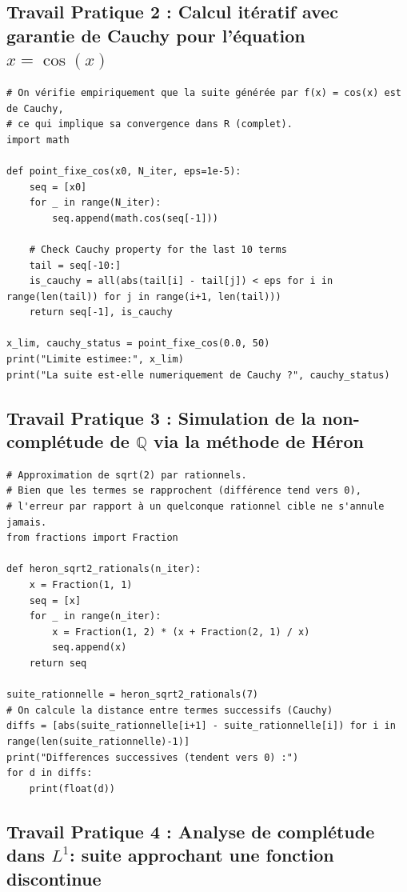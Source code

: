 \documentclass[11pt,a4paper]{article}
\begin{document}
\subsection*{Travail Pratique 2 : Calcul itératif avec garantie de Cauchy pour l'équation $x = \cos(x)$}

\begin{lstlisting}
# On vérifie empiriquement que la suite générée par f(x) = cos(x) est de Cauchy,
# ce qui implique sa convergence dans R (complet).
import math

def point_fixe_cos(x0, N_iter, eps=1e-5):
    seq = [x0]
    for _ in range(N_iter):
        seq.append(math.cos(seq[-1]))

    # Check Cauchy property for the last 10 terms
    tail = seq[-10:]
    is_cauchy = all(abs(tail[i] - tail[j]) < eps for i in range(len(tail)) for j in range(i+1, len(tail)))
    return seq[-1], is_cauchy

x_lim, cauchy_status = point_fixe_cos(0.0, 50)
print("Limite estimee:", x_lim)
print("La suite est-elle numeriquement de Cauchy ?", cauchy_status)

\end{lstlisting}


\subsection*{Travail Pratique 3 : Simulation de la non-complétude de $\mathbb{Q}$ via la méthode de Héron}

\begin{lstlisting}
# Approximation de sqrt(2) par rationnels.
# Bien que les termes se rapprochent (différence tend vers 0),
# l'erreur par rapport à un quelconque rationnel cible ne s'annule jamais.
from fractions import Fraction

def heron_sqrt2_rationals(n_iter):
    x = Fraction(1, 1)
    seq = [x]
    for _ in range(n_iter):
        x = Fraction(1, 2) * (x + Fraction(2, 1) / x)
        seq.append(x)
    return seq

suite_rationnelle = heron_sqrt2_rationals(7)
# On calcule la distance entre termes successifs (Cauchy)
diffs = [abs(suite_rationnelle[i+1] - suite_rationnelle[i]) for i in range(len(suite_rationnelle)-1)]
print("Differences successives (tendent vers 0) :")
for d in diffs:
    print(float(d))

\end{lstlisting}


\subsection*{Travail Pratique 4 : Analyse de complétude dans $L^1$: suite approchant une fonction discontinue}
\end{document}
